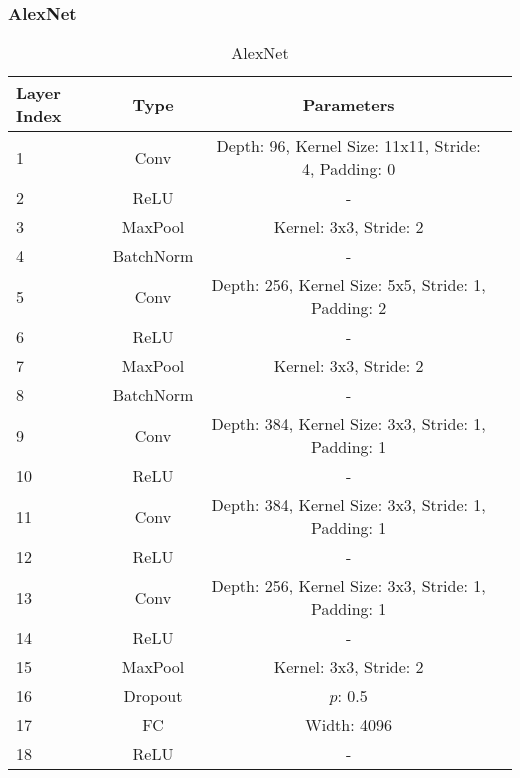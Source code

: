 \documentclass[10pt,twocolumn,letterpaper]{article}
\begin{document}
\subsubsection{AlexNet}
\begin{table}[ht]
    \caption{AlexNet}
    \centering
    \scriptsize
    \begin{tabular}{|l|c|c|r}
        \toprule
        \toprule
        Layer Index & Type & Parameters \\
        \midrule
        \multirow{1}{0.5cm}{1} & Conv & Depth: 96, Kernel Size: 11x11, Stride: 4, Padding: 0\\
        \multirow{1}{0.5cm}{2} & ReLU & -\\
        \multirow{1}{0.5cm}{3} & MaxPool & Kernel: 3x3, Stride: 2\\
        \multirow{1}{0.5cm}{4} & BatchNorm & -\\
        
        \multirow{1}{0.5cm}{5} & Conv & Depth: 256, Kernel Size: 5x5, Stride: 1, Padding: 2\\
        \multirow{1}{0.5cm}{6} & ReLU & -\\
        \multirow{1}{0.5cm}{7} & MaxPool & Kernel: 3x3, Stride: 2\\
        \multirow{1}{0.5cm}{8} & BatchNorm & -\\
        
        \multirow{1}{0.5cm}{9} & Conv & Depth: 384, Kernel Size: 3x3, Stride: 1, Padding: 1\\
        \multirow{1}{0.5cm}{10} & ReLU & -\\
        \multirow{1}{0.5cm}{11} & Conv & Depth: 384, Kernel Size: 3x3, Stride: 1, Padding: 1\\
        \multirow{1}{0.5cm}{12} & ReLU & -\\
        
        \multirow{1}{0.5cm}{13} & Conv & Depth: 256, Kernel Size: 3x3, Stride: 1, Padding: 1\\
        \multirow{1}{0.5cm}{14} & ReLU & -\\
        \multirow{1}{0.5cm}{15} & MaxPool & Kernel: 3x3, Stride: 2\\
        
        \multirow{1}{0.5cm}{16} & Dropout & $p$: 0.5\\
        \multirow{1}{0.5cm}{17} & FC & Width: 4096\\
        \multirow{1}{0.5cm}{18} & ReLU & -\\
        

\end{tabular}
\end{table}
\end{document}
